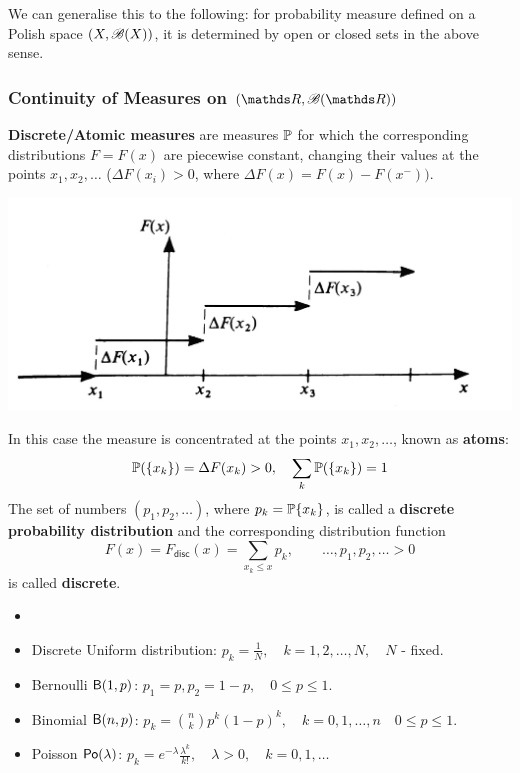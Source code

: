 \begin{unexaminable}
\begin{example}
We can generalise this to the following: for probability measure defined on a Polish space $(X,\mathcal{B}(X))$, it is determined by open or closed sets in the above sense.
\end{example}
\end{unexaminable}

\subsubsection{Continuity of Measures on $(\R, \B(\R))$}

\textbf{Discrete/Atomic measures} are measures $\mathbb{P}$ for which the corresponding distributions $F = F(x)$ are piecewise constant, changing their values at the points $x_1, x_2, \dots$ ($\Delta F(x_i) >0$, where $\Delta F(x) = F(x) - F(x^-))$. 
\begin{center}
    \includegraphics[scale = 0.2]{1.jpg}
\end{center}
In this case the measure is concentrated at the points $x_1, x_2, \dots$, known as \textbf{atoms}:
\begin{equation*}
    \mathbb{P}(\{ x_k \}) = \Delta F(x_k)>0, \quad \sum_k \mathbb{P}(\{x_k \}) = 1
\end{equation*}
The set of numbers $(p_1, p_2, \dots)$, where $p_k = \mathbb{P}\{x_k\}$, is called a \textbf{discrete probability distribution} and the corresponding distribution function 
\begin{equation*}
    F(x) = F_{\mathsf{disc}}(x) = \sum_{x_k \le x}p_k, \quad \quad \dots, p_1, p_2, \dots >0
\end{equation*}
is called \textbf{discrete}.
\begin{example}
\begin{itemize}
    \item[]
    \item Discrete Uniform distribution: $p_k = \frac{1}{N}, \quad k = 1,2,\dots, N, \quad N$ - fixed.
    \item Bernoulli $\mathsf{B}(1,p)$: $p_1 = p, p_2 = 1-p,\quad 0 \le p \le 1.$
    \item Binomial $\mathsf{B}(n,p)$: $p_k = \binom{n}{k} p^k (1-p)^k,\quad k = 0,1,\dots,n \quad 0 \le p \le 1.$
    \item Poisson $\mathsf{Po}(\lambda)$: $p_k = e^{-\lambda}\frac{\lambda^k}{k!}, \quad \lambda>0,\quad k = 0,1,\dots$
\end{itemize}
\end{example}
